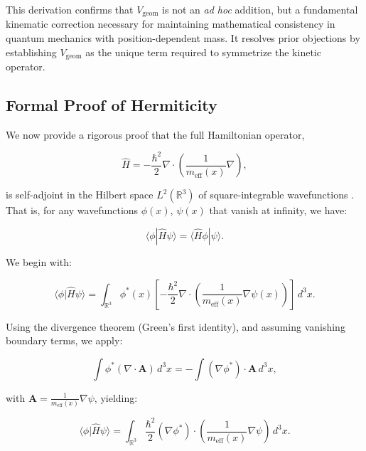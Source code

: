 \documentclass[a4paper]{article}
\begin{document}
This derivation confirms that \( V_{\text{geom}} \) is not an \textit{ad hoc} addition, but a fundamental kinematic correction necessary for maintaining mathematical consistency in quantum mechanics with position-dependent mass. It resolves prior objections by establishing \( V_{\text{geom}} \) as the unique term required to symmetrize the kinetic operator.

\subsection{Formal Proof of Hermiticity} \label{subsec:hermiticity}

We now provide a rigorous proof that the full Hamiltonian operator,

\begin{equation}
	\hat{H} = -\frac{\hbar^2}{2} \nabla \cdot \left( \frac{1}{m_{\text{eff}}(x)} \nabla \right),
\end{equation}

is self-adjoint in the Hilbert space \( L^2(\mathbb{R}^3) \) of square-integrable wavefunctions \cite{Landau1977}. That is, for any wavefunctions \( \phi(x) \), \( \psi(x) \) that vanish at infinity, we have:

\begin{equation}
	\langle \phi | \hat{H} \psi \rangle = \langle \hat{H} \phi | \psi \rangle.
\end{equation}

We begin with:

\begin{equation}
	\langle \phi | \hat{H} \psi \rangle = \int_{\mathbb{R}^3} \phi^*(x) \left[ -\frac{\hbar^2}{2} \nabla \cdot \left( \frac{1}{m_{\text{eff}}(x)} \nabla \psi(x) \right) \right] \, d^3x.
\end{equation}

Using the divergence theorem (Green’s first identity), and assuming vanishing boundary terms, we apply:

\begin{equation}
	\int \phi^*(\nabla \cdot \mathbf{A})\, d^3x = -\int (\nabla \phi^*) \cdot \mathbf{A} \, d^3x,
\end{equation}

with \( \mathbf{A} = \frac{1}{m_{\text{eff}}(x)} \nabla \psi \), yielding:

\begin{equation}
	\langle \phi | \hat{H} \psi \rangle = \int_{\mathbb{R}^3} \frac{\hbar^2}{2} (\nabla \phi^*) \cdot \left( \frac{1}{m_{\text{eff}}(x)} \nabla \psi \right) \, d^3x.
\end{equation}
\end{document}
